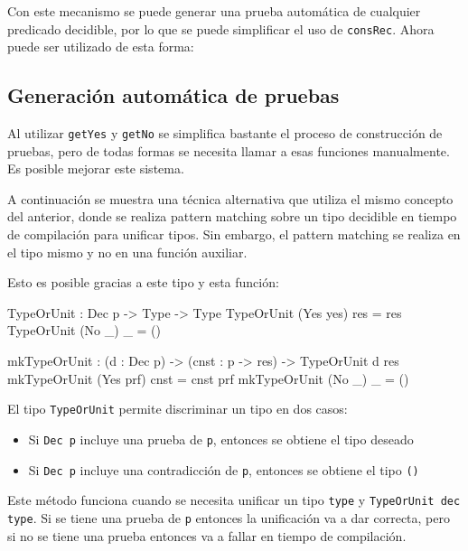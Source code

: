 Con este mecanismo se puede generar una prueba automática de cualquier predicado decidible, por lo que se puede simplificar el uso de \texttt{consRec}. Ahora puede ser utilizado de esta forma:


\subsection{Generación automática de pruebas}

Al utilizar \texttt{getYes} y \texttt{getNo} se simplifica bastante el proceso de construcción de pruebas, pero de todas formas se necesita llamar a esas funciones manualmente. Es posible mejorar este sistema.

A continuación se muestra una técnica alternativa que utiliza el mismo concepto del anterior, donde se realiza pattern matching sobre un tipo decidible en tiempo de compilación para unificar tipos. Sin embargo, el pattern matching se realiza en el tipo mismo y no en una función auxiliar.

Esto es posible gracias a este tipo y esta función:

\begin{code}
TypeOrUnit : Dec p -> Type -> Type
TypeOrUnit (Yes yes) res = res
TypeOrUnit (No _) _ = ()

mkTypeOrUnit : (d : Dec p) -> (cnst : p -> res) ->
  TypeOrUnit d res
mkTypeOrUnit (Yes prf) cnst = cnst prf
mkTypeOrUnit (No _) _ = ()
\end{code}

El tipo \texttt{TypeOrUnit} permite discriminar un tipo en dos casos:
\begin{itemize}
\item Si \texttt{Dec p} incluye una prueba de \texttt{p}, entonces se obtiene el tipo deseado
\item Si \texttt{Dec p} incluye una contradicción de \texttt{p}, entonces se obtiene el tipo \texttt{()}
\end{itemize}

Este método funciona cuando se necesita unificar un tipo \texttt{type} y \texttt{TypeOrUnit dec type}. Si se tiene una prueba de \texttt{p} entonces la unificación va a dar correcta, pero si no se tiene una prueba entonces va a fallar en tiempo de compilación.


